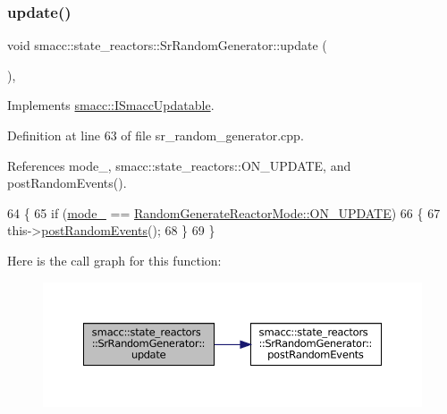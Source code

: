 \mbox{\label{classsmacc_1_1state__reactors_1_1SrRandomGenerator_adf6e20208210f30639b92214e1dda83b}} 
\subsubsection{\texorpdfstring{update()}{update()}}
{\footnotesize\ttfamily void smacc\+::state\+\_\+reactors\+::\+Sr\+Random\+Generator\+::update (\begin{DoxyParamCaption}{ }\end{DoxyParamCaption})\hspace{0.3cm}{\ttfamily [override]}, {\ttfamily [virtual]}}



Implements \hyperlink{classsmacc_1_1ISmaccUpdatable_a84ee0520cbefdb1d412bed54650b028e}{smacc\+::\+I\+Smacc\+Updatable}.



Definition at line 63 of file sr\+\_\+random\+\_\+generator.\+cpp.



References mode\+\_\+, smacc\+::state\+\_\+reactors\+::\+O\+N\+\_\+\+U\+P\+D\+A\+TE, and post\+Random\+Events().


\begin{DoxyCode}
64 \{
65     \textcolor{keywordflow}{if} (\hyperlink{classsmacc_1_1state__reactors_1_1SrRandomGenerator_a10984da2fb51badf4fe6f25861120735}{mode\_} == \hyperlink{namespacesmacc_1_1state__reactors_a038f8e362ad6d35494c940ee4c97a52ea4a6be4c8602d150038b100a35556d3d7}{RandomGenerateReactorMode::ON\_UPDATE})
66     \{
67         this->\hyperlink{classsmacc_1_1state__reactors_1_1SrRandomGenerator_a50638c93ca9444fbeecea6e72bc6ac35}{postRandomEvents}();
68     \}
69 \}
\end{DoxyCode}
Here is the call graph for this function\+:
\nopagebreak
\begin{figure}[H]
\begin{center}
\leavevmode
\includegraphics[width=350pt]{classsmacc_1_1state__reactors_1_1SrRandomGenerator_adf6e20208210f30639b92214e1dda83b_cgraph}
\end{center}
\end{figure}


